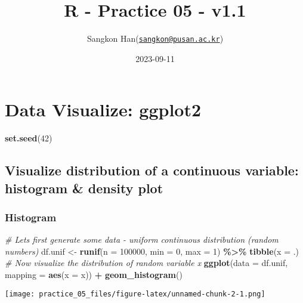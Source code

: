 \documentclass[
]{article}
\title{R - Practice 05 - v1.1}
\author{Sangkon
Han(\href{mailto:sangkon@pusan.ac.kr}{\nolinkurl{sangkon@pusan.ac.kr}})}
\date{2023-09-11}
\newenvironment{Shaded}{\begin{snugshade}}{\end{snugshade}}
\newcommand{\AttributeTok}[1]{\textcolor[rgb]{0.13,0.29,0.53}{#1}}
\newcommand{\CommentTok}[1]{\textcolor[rgb]{0.56,0.35,0.01}{\textit{#1}}}
\newcommand{\DecValTok}[1]{\textcolor[rgb]{0.00,0.00,0.81}{#1}}
\newcommand{\FunctionTok}[1]{\textcolor[rgb]{0.13,0.29,0.53}{\textbf{#1}}}
\newcommand{\NormalTok}[1]{#1}
\newcommand{\OtherTok}[1]{\textcolor[rgb]{0.56,0.35,0.01}{#1}}
\newcommand{\SpecialCharTok}[1]{\textcolor[rgb]{0.81,0.36,0.00}{\textbf{#1}}}
\begin{document}
\maketitle

{
\setcounter{tocdepth}{3}
\tableofcontents
}
\section{Data Visualize: ggplot2}\label{data-visualize-ggplot2}

\begin{Shaded}
\begin{Highlighting}[]
\FunctionTok{set.seed}\NormalTok{(}\DecValTok{42}\NormalTok{)}
\end{Highlighting}
\end{Shaded}

\subsection{Visualize distribution of a continuous variable: histogram
\& density
plot}\label{visualize-distribution-of-a-continuous-variable-histogram-density-plot}

\subsubsection{Histogram}\label{histogram}

\begin{Shaded}
\begin{Highlighting}[]
\CommentTok{\#   Let\textquotesingle{}s first generate some data {-} uniform continuous distribution (random numbers)}
\NormalTok{df.unif }\OtherTok{\textless{}{-}} \FunctionTok{runif}\NormalTok{(}\AttributeTok{n =} \DecValTok{100000}\NormalTok{, }\AttributeTok{min =} \DecValTok{0}\NormalTok{, }\AttributeTok{max =} \DecValTok{1}\NormalTok{) }\SpecialCharTok{\%\textgreater{}\%} 
  \FunctionTok{tibble}\NormalTok{(}\AttributeTok{x =}\NormalTok{ .)}
\CommentTok{\#   Now visualize the distribution of random variable x}
\FunctionTok{ggplot}\NormalTok{(}\AttributeTok{data =}\NormalTok{ df.unif, }\AttributeTok{mapping =} \FunctionTok{aes}\NormalTok{(}\AttributeTok{x =}\NormalTok{ x)) }\SpecialCharTok{+} 
  \FunctionTok{geom\_histogram}\NormalTok{()}
\end{Highlighting}
\end{Shaded}

\texttt{[image: practice\_05\_files/figure-latex/unnamed-chunk-2-1.png]}
\end{document}
